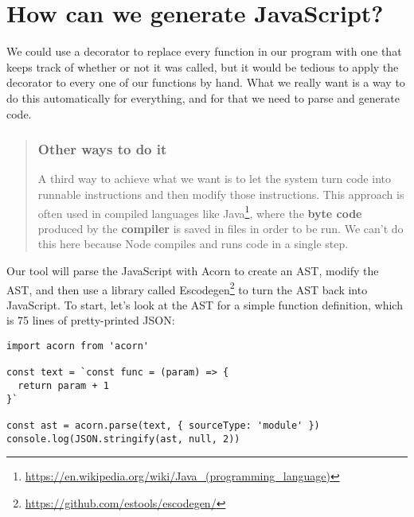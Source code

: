\documentclass[krantzl]{krantz}
\newcommand{\glossref}[1]{\textbf{#1}}
\newenvironment{callout}{\savenotes\begin{tBox}\begin{quotation}\toggletrue{inbox}\renewcommand{\thempfootnote}{\arabic{footnote}}}{\end{quotation}\vspace{\baselineskip}\end{tBox}\togglefalse{inbox}\spewnotes}
\newcommand{\hreffoot}[2]{{#1}\footnote{\href{#2}{#2}}}
\begin{document}
\section{How can we generate JavaScript?}\label{code-generator-generate}


We could use a decorator to replace every function in our program
with one that keeps track of whether or not it was called,
but it would be tedious to apply the decorator to every one of our functions by hand.
What we really want is a way to do this automatically for everything,
and for that we need to parse and generate code.

\begin{callout}


\subsubsection*{Other ways to do it}


A third way to achieve what we want is
to let the system turn code into runnable instructions
and then modify those instructions.
This approach is often used in compiled languages like \hreffoot{Java}{https://en.wikipedia.org/wiki/Java\_(programming\_language)},
where the \glossref{byte code} produced by the \glossref{compiler} is saved in files
in order to be run.
We can't do this here because Node compiles and runs code in a single step.

\end{callout}


Our tool will parse the JavaScript with Acorn to create an AST,
modify the AST,
and then use a library called \hreffoot{Escodegen}{https://github.com/estools/escodegen/} to turn the AST back into JavaScript.
To start,
let's look at the AST for a simple function definition,
which is 75 lines of pretty-printed JSON:


\begin{lstlisting}[frame=single,frameround=tttt]
import acorn from 'acorn'

const text = `const func = (param) => {
  return param + 1
}`

const ast = acorn.parse(text, { sourceType: 'module' })
console.log(JSON.stringify(ast, null, 2))
\end{lstlisting}
\end{document}
